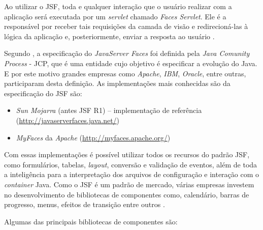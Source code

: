 \par Ao utilizar o JSF, toda e qualquer interação que o usuário realizar com a aplicação será executada por 
um \textit{servlet} chamado \textit{Faces Servlet}. Ele é a responsável por
receber tais requisições da camada de visão e redirecioná-las à lógica da aplicação e, posteriormente, enviar a resposta ao 
usuário \cite{faria_java_ee_7_jsf_primefaces_cdi}.

\par Segundo , a especificação do \textit{JavaServer
	Faces} foi definida pela \textit{Java Comunity Process} - JCP\footnotemark[4],
	que é uma entidade cujo objetivo é especificar a evolução do Java. E por este motivo grandes empresas como
\textit{Apache}, \textit{IBM}, \textit{Oracle}, entre outras, participaram
desta definição. As implementações mais conhecidas são da especificação do JSF são:


\begin{itemize}
	\item \textit{Sun Mojarra} (antes JSF R1) – implementação de referência
	(\url{http://javaserverfaces.java.net/})
	
	\item \textit{MyFaces} da \textit{Apache} (\url{http://myfaces.apache.org/})
\end{itemize}

\par Com essas implementações é possível utilizar todos os recursos do padrão JSF,
como formulários, tabelas, \textit{layout}, conversão e validação de eventos,
além de toda a inteligência para a interpretação dos arquivos de configuração e
interação com o \textit{container} Java. Como o JSF é um padrão de mercado,
várias empresas investem no desenvolvimento de bibliotecas de componentes como, calendário, barras de progresso, menus,
efeitos de transição entre outros \cite{livro_programacao_java_para_web}.

\par Algumas das principais bibliotecas de componentes são:


